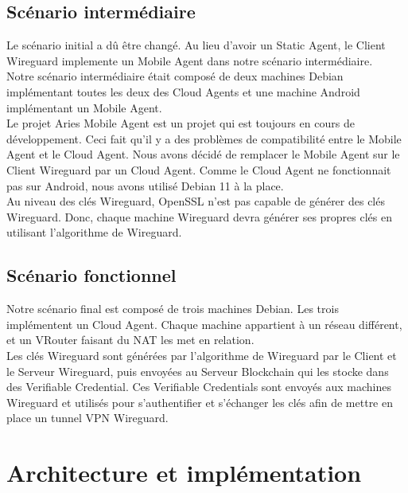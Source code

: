 \documentclass[12pt, openany]{report}
\begin{document}
\subsection{Scénario intermédiaire}
\noindent
\begin{flushleft}
Le scénario initial a dû être changé. Au lieu d'avoir un Static Agent, le Client Wireguard implemente un Mobile Agent dans notre scénario intermédiaire. \\
Notre scénario intermédiaire était composé de deux machines Debian implémentant toutes les deux des Cloud Agents et une machine Android implémentant un Mobile Agent. \\
\vspace{2mm}
Le projet Aries Mobile Agent est un projet qui est toujours en cours de développement. Ceci fait qu'il y a des problèmes de compatibilité entre le Mobile Agent et le Cloud Agent. Nous avons décidé de remplacer le Mobile Agent sur le Client Wireguard par un Cloud Agent. Comme le Cloud Agent ne fonctionnait pas sur Android, nous avons utilisé Debian 11 à la place. \\
\vspace{2mm}
Au niveau des clés Wireguard, OpenSSL n'est pas capable de générer des clés Wireguard. Donc, chaque machine Wireguard devra générer ses propres clés en utilisant l'algorithme de Wireguard.
\end{flushleft}

\subsection{Scénario fonctionnel}
\noindent
\begin{flushleft}
Notre scénario final est composé de trois machines Debian. Les trois implémentent un Cloud Agent. Chaque machine appartient à un réseau différent, et un VRouter faisant du NAT les met en relation. \\
Les clés Wireguard sont générées par l'algorithme de Wireguard par le Client et le Serveur Wireguard, puis envoyées au Serveur Blockchain qui les stocke dans des Verifiable Credential. Ces Verifiable Credentials sont envoyés aux machines Wireguard et utilisés pour s'authentifier et s'échanger les clés afin de mettre en place un tunnel VPN Wireguard.
\end{flushleft}

\section{Architecture et implémentation}
\end{document}
